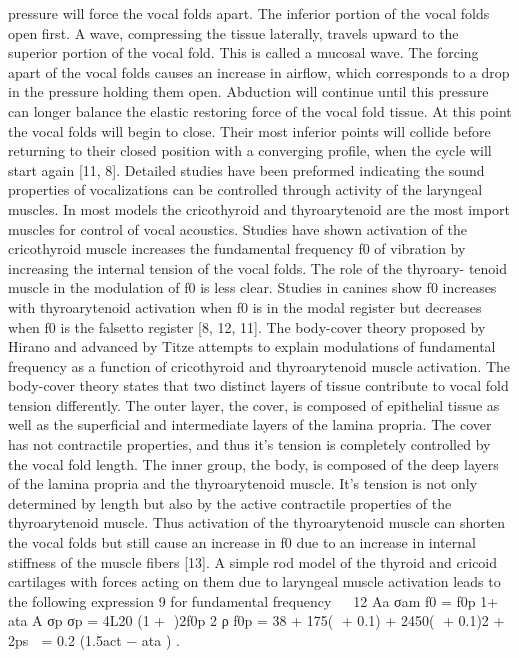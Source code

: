 \documentclass[12pt, letter]{report}
\begin{document}
pressure will force the vocal folds apart. The inferior portion of the vocal folds
open first. A wave, compressing the tissue laterally, travels upward to the
superior portion of the vocal fold. This is called a mucosal wave. The forcing
apart of the vocal folds causes an increase in airflow, which corresponds to a
drop in the pressure holding them open. Abduction will continue until this
pressure can longer balance the elastic restoring force of the vocal fold tissue.
At this point the vocal folds will begin to close. Their most inferior points
will collide before returning to their closed position with a converging profile,
when the cycle will start again [11, 8].
Detailed studies have been preformed indicating the sound properties of
vocalizations can be controlled through activity of the laryngeal muscles.
In most models the cricothyroid and thyroarytenoid are the most import
muscles for control of vocal acoustics. Studies have shown activation of the
cricothyroid muscle increases the fundamental frequency f0 of vibration by
increasing the internal tension of the vocal folds. The role of the thyroary-
tenoid muscle in the modulation of f0 is less clear. Studies in canines show f0
increases with thyroarytenoid activation when f0 is in the modal register but
decreases when f0 is the falsetto register [8, 12, 11]. The body-cover theory
proposed by Hirano and advanced by Titze attempts to explain modulations
of fundamental frequency as a function of cricothyroid and thyroarytenoid
muscle activation. The body-cover theory states that two distinct layers of
tissue contribute to vocal fold tension differently. The outer layer, the cover,
is composed of epithelial tissue as well as the superficial and intermediate
layers of the lamina propria. The cover has not contractile properties, and
thus it’s tension is completely controlled by the vocal fold length. The inner
group, the body, is composed of the deep layers of the lamina propria and
the thyroarytenoid muscle. It’s tension is not only determined by length but
also by the active contractile properties of the thyroarytenoid muscle. Thus
activation of the thyroarytenoid muscle can shorten the vocal folds but still
cause an increase in f0 due to an increase in internal stiffness of the muscle
fibers [13].
A simple rod model of the thyroid and cricoid cartilages with forces acting
on them due to laryngeal muscle activation leads to the following expression
9
for fundamental frequency

  12
Aa σam
f0 = f0p
 1+
 ata
A σp
σp = 4L20 (1 + )2f0p
 2
 ρ
f0p = 38 + 175( + 0.1) + 2450( + 0.1)2 + 2ps
 = 0.2 (1.5act − ata ) .
\end{document}
